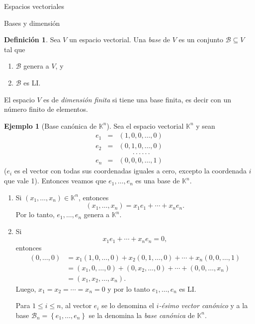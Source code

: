 \documentclass[a4paper,12pt,twoside,spanish,reqno]{amsbook}
\theoremstyle{definition}
\newtheorem{definicion}{Definici\'on}[section]
\newtheorem{ejemplo}{Ejemplo}[section]
\theoremstyle{remark}
\newcommand{\K}{\mathbb K}
\begin{document}
\begin{chapter}{Espacios vectoriales}
\begin{section}{Bases y dimensión}
 \begin{definicion}
     Sea $V$ un espacio vectorial. Una \textit{base} de $V$ es un conjunto $\mathcal B \subseteq V$ tal que
     \begin{enumerate}
         \item $\mathcal B$ genera a $V$, y
         \item $\mathcal B$ es LI.
     \end{enumerate}
      El espacio $V$ es de \textit{dimensión finita} si tiene una base finita,  es decir con  un número finito de elementos.
 \end{definicion}



\begin{ejemplo}[{\sc Base canónica de $\K^n$}] Sea el espacio vectorial $\K^n$ y sean
    \begin{equation*}
    \begin{array}{rcl}
    e_1 &=& (1,0,0,\ldots,0) \\
    e_2 &=& (0,1,0,\ldots,0) \\
    &&\qquad.\,.\,.\,.\,.\,.\,\\ 
    e_n&=& (0,0,0,\ldots,1)
    \end{array}
    \end{equation*}
    ($e_i$ es el vector con todas sus coordenadas iguales a cero,  excepto  la coordenada $i$ que vale 1). Entonces veamos que  $e_1,\ldots,e_n$ es una base de $\K^n$.
    \begin{enumerate}
        \item Si $(x_1,\ldots,x_n) \in \K^n$,  entonces
        $$
        (x_1,\ldots,x_n) = x_1e_1+\cdots+x_ne_n.
        $$
        Por lo tanto, $e_1,\ldots,e_n$ genera a  $\K^n$.
        \item Si 
        $$
        x_1e_1+\cdots+x_ne_n =0,
        $$
        entonces
        \begin{align*}
            (0,\ldots,0) &= x_1(1,0,\ldots,0)+ x_2(0,1,\ldots,0)+\cdots+x_n(0,0,\ldots,1)\\ 
            &=  (x_1,0,\ldots,0)+(0,x_2,\ldots,0)+\cdots+(0,0,\ldots,x_n)\\ &= (x_1,x_2,\ldots,x_n).
        \end{align*}
        Luego, $x_1= x_2=\cdots=x_n =0$ y por lo tanto $e_1,\ldots,e_n$ es LI.
        
        Para $1 \le i \le n$, al vector $e_i$ se lo denomina el \textit{$i$-ésimo vector canónico}  y a la base $\mathcal B_n = \left\{e_1,\ldots,e_n \right\}$ se la denomina la \textit{base canónica} de $\K^n$. 
        

\end{enumerate}
\end{ejemplo}
\end{section}
\end{chapter}
\end{document}
